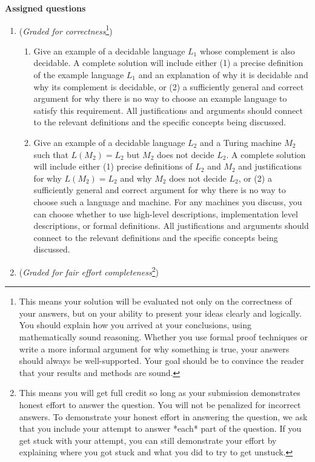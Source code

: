\newpage
{\bf Assigned questions}
\begin{enumerate}
    \item ({\it Graded for correctness}\footnote{This means your solution will be
    evaluated not only on the correctness of your answers, but on your ability to 
    present your ideas clearly and logically. You should explain how you arrived at 
    your conclusions, using  mathematically sound reasoning. Whether you use formal proof techniques or 
    write a more informal argument for why 
    something is true, your answers should always be well-supported. Your goal 
    should be to convince the reader that 
    your results and methods are sound.}) 
    \begin{enumerate}
        \item Give an example of a decidable language $L_1$ whose complement is also decidable.
        A complete solution will include either (1) a precise definition of the example language $L_1$ and 
        an explanation of why it is decidable and why its complement is decidable, or 
        (2) a sufficiently general and correct argument for why there is no way to choose 
        an example language to satisfy this requirement. All justifications and arguments should
        connect to the relevant definitions and the specific concepts being discussed.
        \item Give an example of a decidable language $L_2$ and a Turing machine $M_2$ such that
        $L(M_2) = L_2$ but $M_2$ does not decide $L_2$.  A complete solution will include either (1) precise
        definitions of $L_2$ and $M_2$ and justifications for why $L(M_2) = L_2$ and why $M_2$
        does not decide $L_2$, or (2) a sufficiently general and correct argument for why there is no way to choose 
        such a language and machine. For any machines you discuss, you can choose whether to use high-level descriptions,
        implementation level descriptions, or formal definitions. All justifications and arguments should
        connect to the relevant definitions and the specific concepts being discussed.
    \end{enumerate}
    \item ({\it Graded for fair effort completeness}\footnote{This means 
    you will get full credit so long as your submission demonstrates honest 
    effort to answer the question. You will not be penalized for incorrect answers. 
    To demonstrate your honest effort in answering the question, we ask that you 
    include your attempt to answer *each* part of the question. If you get stuck 
    with your attempt, you can still demonstrate your effort by explaining where 
    you got stuck and what you did to try to get unstuck.})


\end{enumerate}

